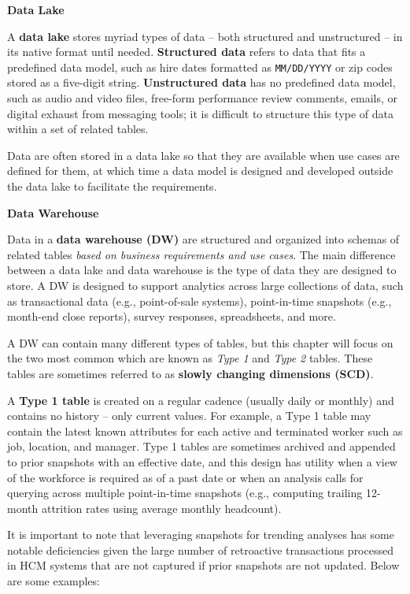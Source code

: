 \documentclass[
]{book}
\begin{document}
\textbf{Data Lake}

A \textbf{data lake} stores myriad types of data -- both structured and unstructured -- in its native format until needed. \textbf{Structured data} refers to data that fits a predefined data model, such as hire dates formatted as \texttt{MM/DD/YYYY} or zip codes stored as a five-digit string. \textbf{Unstructured data} has no predefined data model, such as audio and video files, free-form performance review comments, emails, or digital exhaust from messaging tools; it is difficult to structure this type of data within a set of related tables.

Data are often stored in a data lake so that they are available when use cases are defined for them, at which time a data model is designed and developed outside the data lake to facilitate the requirements.

\textbf{Data Warehouse}

Data in a \textbf{data warehouse (DW)} are structured and organized into schemas of related tables \emph{based on business requirements and use cases}. The main difference between a data lake and data warehouse is the type of data they are designed to store. A DW is designed to support analytics across large collections of data, such as transactional data (e.g., point-of-sale systems), point-in-time snapshots (e.g., month-end close reports), survey responses, spreadsheets, and more.

A DW can contain many different types of tables, but this chapter will focus on the two most common which are known as \emph{Type 1} and \emph{Type 2} tables. These tables are sometimes referred to as \textbf{slowly changing dimensions (SCD)}.

A \textbf{Type 1 table} is created on a regular cadence (usually daily or monthly) and contains no history -- only current values. For example, a Type 1 table may contain the latest known attributes for each active and terminated worker such as job, location, and manager. Type 1 tables are sometimes archived and appended to prior snapshots with an effective date, and this design has utility when a view of the workforce is required as of a past date or when an analysis calls for querying across multiple point-in-time snapshots (e.g., computing trailing 12-month attrition rates using average monthly headcount).

It is important to note that leveraging snapshots for trending analyses has some notable deficiencies given the large number of retroactive transactions processed in HCM systems that are not captured if prior snapshots are not updated. Below are some examples:
\end{document}

